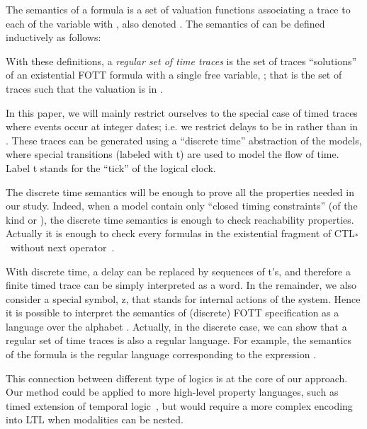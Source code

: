 \documentclass[a4paper]{scrartcl}
\def\vars#1{\textsf{\small #1}}
\newcommand{\kleene}{\ensuremath{\mathclose{\overset{*}{\ }}}}
\begin{document}
The semantics of a formula  is a set of
valuation functions  associating a trace  to each of the variable  with , also
denoted . The semantics of 
can be defined inductively as follows:


With these definitions, a \emph{regular set of time traces} is the set
of traces ``solutions'' of an existential FOTT formula with a single
free variable, ; that is the set of traces  such that the
valuation  is in .

In this paper, we will mainly restrict ourselves to the special case
of timed traces where events occur at integer dates; i.e. we restrict
delays  to be in  rather than in . These
traces can be generated using a ``discrete time'' abstraction of the
models, where special transitions (labeled with \vars{t}) are used to
model the flow of time. Label \vars{t} stands for the ``tick'' of the
logical clock.



The discrete time semantics will be enough to prove all the properties
needed in our study. Indeed, when a model contain only ``closed timing
constraints'' (of the kind  or ), the
discrete time semantics is enough to check reachability
properties. Actually it is enough to check every formulas in the
existential fragment of CTL\kleene\ without next
operator~\cite{janowska2011towards}.

With discrete time, a delay  can be replaced by sequences of
 \vars{t}'s, and therefore a finite timed trace can be simply
interpreted as a word. In the remainder, we also consider a special
symbol, \vars{z}, that stands for internal actions of the
system. Hence it is possible to interpret the semantics of (discrete)
FOTT specification as a language over the alphabet . Actually, in the discrete
case, we can show that a regular set of time traces is also a regular
language. For example, the semantics of the formula  is the regular
language corresponding to the expression .

This connection between different type of logics is at the core of our
approach. Our method could be applied to more high-level property
languages, such as timed extension of temporal logic~\cite{SRPMTL},
but would require a more complex encoding into LTL when modalities can
be nested.
\end{document}
